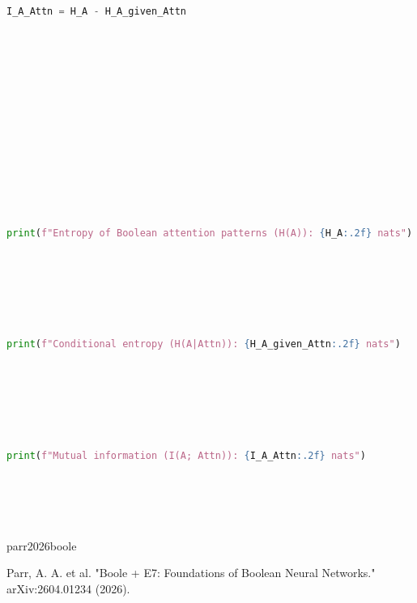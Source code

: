 \begin{lstlisting}[language=Python]
I_A_Attn = H_A - H_A_given_Attn













print(f"Entropy of Boolean attention patterns (H(A)): {H_A:.2f} nats")






print(f"Conditional entropy (H(A|Attn)): {H_A_given_Attn:.2f} nats")






print(f"Mutual information (I(A; Attn)): {I_A_Attn:.2f} nats")






\end{lstlisting}













\begin{bibitem}{parr2026boole}






Parr, A. A. et al. "Boole + E7: Foundations of Boolean Neural Networks." arXiv:2604.01234 (2026).






\end{bibitem}





































